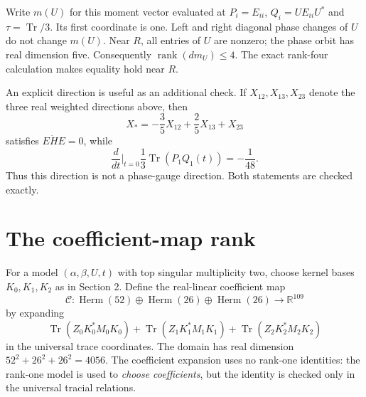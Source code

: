 \documentclass[11pt]{article}
\theoremstyle{remark}\newtheorem{remark}[theorem]{Remark}
\newcommand{\R}{\mathbb R}
\newcommand{\Tr}{\operatorname{Tr}}
\newcommand{\rank}{\operatorname{rank}}
\newcommand{\Herm}{\operatorname{Herm}}
\newcommand{\calC}{\mathcal C}
\begin{document}
Write $m(U)$ for this moment vector evaluated at $P_i=E_{ii}$, $Q_i=UE_{ii}U^*$ and $\tau=\Tr/3$. Its first coordinate is one. Left and right diagonal phase changes of $U$ do not change $m(U)$. Near $R$, all entries of $U$ are nonzero; the phase orbit has real dimension five. Consequently $\rank(dm_U)\le4$. The exact rank-four calculation makes equality hold near $R$.

An explicit direction is useful as an additional check. If $X_{12},X_{13},X_{23}$ denote the three real weighted directions above, then
\begin{equation}\label{eq:flat-tangent}
 X_*=-\frac35X_{12}+\frac25X_{13}+X_{23}
\end{equation}
satisfies $E\dot H E=0$, while
\begin{equation}\label{eq:nonzero-moment}
 \frac{d}{dt}\bigg|_{t=0}\frac13\Tr(P_1Q_1(t))=-\frac1{48}.
\end{equation}
Thus this direction is not a phase-gauge direction. Both statements are checked exactly.

\section{The coefficient-map rank}
For a model $(\alpha,\beta,U,t)$ with top singular multiplicity two, choose kernel bases $K_0,K_1,K_2$ as in Section 2. Define the real-linear coefficient map
\begin{equation}\label{eq:Cmap}
 \calC:\Herm(52)\oplus\Herm(26)\oplus\Herm(26)\longrightarrow\R^{109}
\end{equation}
by expanding
\[
 \Tr(Z_0K_0^*M_0K_0)+\Tr(Z_1K_1^*M_1K_1)
 +\Tr(Z_2K_2^*M_2K_2)
\]
in the universal trace coordinates. The domain has real dimension $52^2+26^2+26^2=4056$. The coefficient expansion uses no rank-one identities: the rank-one model is used to \emph{choose coefficients}, but the identity is checked only in the universal tracial relations.
\end{document}
